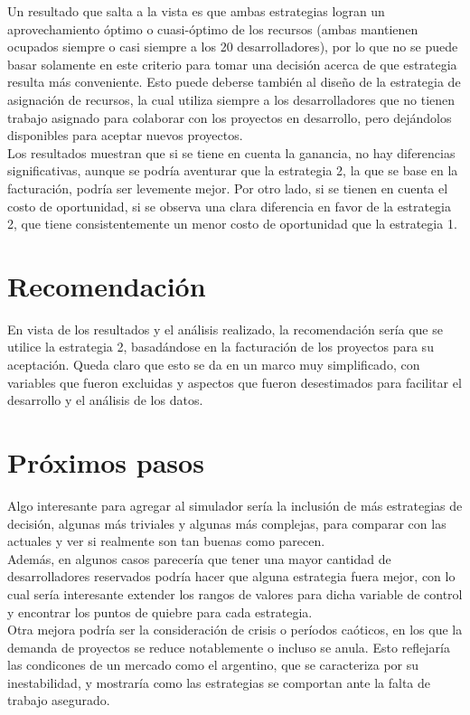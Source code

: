 Un resultado que salta a la vista es que ambas estrategias logran un aprovechamiento óptimo o cuasi-óptimo de los recursos (ambas mantienen ocupados siempre
o casi siempre a los 20 desarrolladores), por lo que no se puede basar solamente en este criterio para tomar una decisión acerca de que estrategia resulta más conveniente.
Esto puede deberse también al diseño de la estrategia de asignación de recursos, la cual utiliza siempre a los desarrolladores que no tienen trabajo asignado para colaborar con 
los proyectos en desarrollo, pero dejándolos disponibles para aceptar nuevos proyectos.\\

Los resultados muestran que si se tiene en cuenta la ganancia, no hay diferencias significativas, aunque se podría 
aventurar que la estrategia 2, la que se base en la facturación, podría ser levemente mejor. Por otro lado, si se tienen en 
cuenta el costo de oportunidad, si se observa una clara diferencia en favor de la estrategia 2, que tiene consistentemente un menor costo de 
oportunidad que la estrategia 1.\\

\section{Recomendación}

En vista de los resultados y el análisis realizado, la recomendación sería que se utilice la estrategia 2, basadándose en la facturación de los proyectos para su aceptación.
Queda claro que esto se da en un marco muy simplificado, con variables que fueron excluidas y aspectos que fueron desestimados para facilitar el desarrollo y el análisis de los
datos.\\

\section{Próximos pasos}

Algo interesante para agregar al simulador sería la inclusión de más estrategias de decisión, algunas más triviales y algunas más complejas, para comparar 
con las actuales y ver si realmente son tan buenas como parecen. \\

Además, en algunos casos parecería que tener una mayor cantidad de desarrolladores reservados podría hacer que alguna estrategia fuera mejor, con lo cual sería interesante
extender los rangos de valores para dicha variable de control y encontrar los puntos de quiebre para cada estrategia.\\

Otra mejora podría ser la consideración de crisis o períodos caóticos, en los que la demanda de proyectos se reduce notablemente o 
incluso se anula. Esto reflejaría las condicones de un mercado como el argentino, que se caracteriza por su inestabilidad, y mostraría como las 
estrategias se comportan ante la falta de trabajo asegurado.\\



